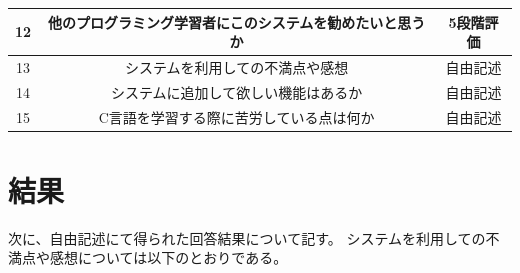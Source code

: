 \documentclass{cssspaper}
\begin{document}
\begin{table}[h]
\begin{tabular}{ccc}
              \hline
              12    & 他のプログラミング学習者にこのシステムを勧めたいと思うか & 5段階評価        \\
              \hline
              13    & システムを利用しての不満点や感想              & 自由記述        \\
              \hline
              14    & システムに追加して欲しい機能はあるか          & 自由記述       \\
              \hline
              15    & C言語を学習する際に苦労している点は何か          & 自由記述        \\
              \hline \hline
              \hline
            \end{tabular}
        \end{table}

        \section{結果}


        次に、自由記述にて得られた回答結果について記す。
        システムを利用しての不満点や感想については以下のとおりである。
\end{document}

